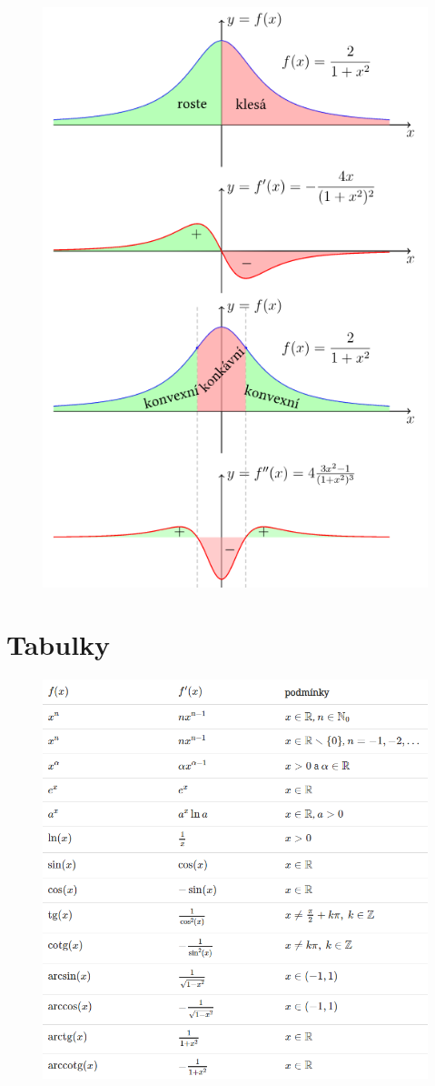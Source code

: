 \documentclass{szzclass}
\begin{document}
\begin{figure}[h]
    \includegraphics[width=.7\textwidth, center]{topics/bi-spol-34/images/prubeh.png}
\end{figure}

\newpage
\section{Tabulky}

\begin{figure}[h]
    \includegraphics[width=\textwidth, center]{topics/bi-spol-34/images/derivace.png}
\end{figure}
\end{document}

